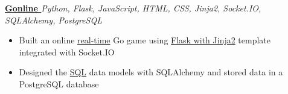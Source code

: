 \textbf{\href{https://github.com/ThangMinhCao/gonline}{Gonline }} \hfill \textit{Python, Flask, JavaScript, HTML, CSS, Jinja2, Socket.IO, SQLAlchemy, PostgreSQL} \par
\begin{itemize}
	\item Built an online \ul{real-time} Go game using \ul{Flask with Jinja2} template integrated with Socket.IO
	\item Designed the \ul{SQL} data models with SQLAlchemy and stored data in a PostgreSQL database
\end{itemize}\vspace{0.1cm} \par